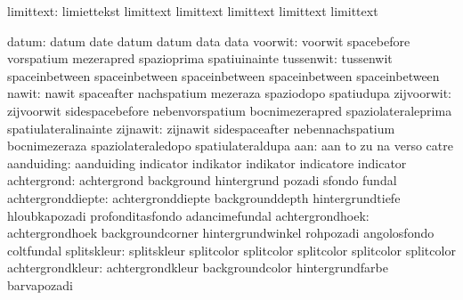                 limittext: limiettekst               limittext
                           limittext                 limittext
                           limittext                 limittext

                    datum: datum                     date
                           datum                     datum
                           data                      data
                  voorwit: voorwit                   spacebefore
                           vorspatium                mezerapred
                           spazioprima               spatiuinainte
                tussenwit: tussenwit                 spaceinbetween
                           spaceinbetween            spaceinbetween
                           spaceinbetween            spaceinbetween
                    nawit: nawit                     spaceafter
                           nachspatium               mezeraza
                           spaziodopo                spatiudupa
               zijvoorwit: zijvoorwit                sidespacebefore
                           nebenvorspatium           bocnimezerapred
                           spaziolateraleprima       spatiulateralinainte
                 zijnawit: zijnawit                  sidespaceafter
                           nebennachspatium          bocnimezeraza
                           spaziolateraledopo        spatiulateraldupa
                      aan: aan                       to
                           zu                        na
                           verso                     catre
               aanduiding: aanduiding                indicator
                           indikator                 indikator
                           indicatore                indicator
              achtergrond: achtergrond               background
                           hintergrund               pozadi
                           sfondo                    fundal
        achtergronddiepte: achtergronddiepte         backgrounddepth
                           hintergrundtiefe          hloubkapozadi
                           profonditasfondo          adancimefundal
          achtergrondhoek: achtergrondhoek           backgroundcorner
                           hintergrundwinkel         rohpozadi
                           angolosfondo              coltfundal
splitskleur: splitskleur splitcolor
             splitcolor  splitcolor
             splitcolor  splitcolor
         achtergrondkleur: achtergrondkleur          backgroundcolor
                           hintergrundfarbe          barvapozadi
